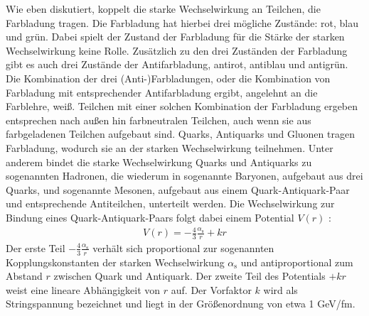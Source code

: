 Wie eben diskutiert, koppelt die starke Wechselwirkung an Teilchen, die Farbladung tragen.
Die Farbladung hat hierbei drei m\"ogliche Zust\"ande: rot, blau und gr\"un.
Dabei spielt der Zustand der Farbladung f\"ur die St\"arke der starken Wechselwirkung keine Rolle.
Zus\"atzlich zu den drei Zust\"anden der Farbladung gibt es auch drei Zust\"ande der Antifarbladung, antirot, antiblau und antigr\"un.
\newline
Die Kombination der drei (Anti-)Farbladungen, oder die Kombination von Farbladung mit entsprechender Antifarbladung ergibt, angelehnt an die Farblehre, wei{\ss}.
Teilchen mit einer solchen Kombination der Farbladung ergeben entsprechen nach au{\ss}en hin farbneutralen Teilchen, auch wenn sie aus farbgeladenen Teilchen aufgebaut sind.
\newline
Quarks, Antiquarks und Gluonen tragen Farbladung, wodurch sie an der starken Wechselwirkung teilnehmen.
Unter anderem bindet die starke Wechselwirkung Quarks und Antiquarks zu sogenannten Hadronen, die wiederum in sogenannte Baryonen, aufgebaut aus drei Quarks, und sogenannte Mesonen, aufgebaut aus einem Quark-Antiquark-Paar und entsprechende Antiteilchen, unterteilt werden.
\newline
Die Wechselwirkung zur Bindung eines Quark-Antiquark-Paars folgt dabei einem Potential $V(r)$ \cite{script:kt1}:
\begin{align} \label{eq:Potential}
V(r) = -\frac{4}{3}\frac{\alpha_\text{s}}{r} + kr 
\end{align}
Der erste Teil $-\frac{4}{3}\frac{\alpha_\text{s}}{r}$ verh\"alt sich proportional zur sogenannten Kopplungskonstanten der starken Wechselwirkung $\alpha_{\text{s}}$ und antiproportional zum Abstand $r$ zwischen Quark und Antiquark.
\newline
Der zweite Teil des Potentials $+kr$ weist eine lineare Abh\"angigkeit von $r$ auf.
Der Vorfaktor $k$ wird als Stringspannung bezeichnet und liegt in der Gr\"o{\ss}enordnung von etwa 1 GeV/fm.
